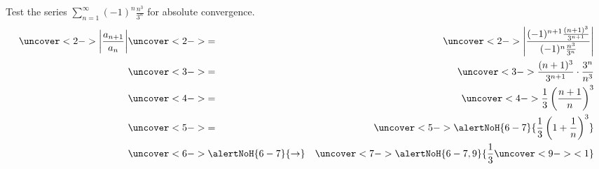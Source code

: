 \begin{frame}
\begin{example} %
Test the series $\displaystyle \sum_{n=1}^\infty (-1)^n \frac{n^3}{3^n}$ for absolute convergence.
\abovedisplayskip=0pt
\belowdisplayskip=0pt
\begin{eqnarray*}
\uncover<2->{%
\left| \frac{a_{n+1}}{a_n}\right| %
}%
 & \uncover<2->{=} & %
\uncover<2->{%
\left| \frac{(-1)^{n+1}\frac{(n+1)^3}{3^{n+1}}}{(-1)^n\frac{n^3}{3^n}}\right| %
}\\%
 & \uncover<3->{=} & %
\uncover<3->{%
\frac{(n+1)^3}{3^{n+1}}\cdot \frac{3^n}{n^3}%
}\\%
 & \uncover<4->{=} & %
\uncover<4->{%
\frac{1}{3} \left( \frac{n+1}{n}\right)^3%
}\\%
 & \uncover<5->{=} & %
\uncover<5->{%
\alertNoH{ 6-7}{%
\frac{1}{3} \left( 1 + \frac{1}{n}\right)^3%
}%
}\\%
 & \uncover<6->{\alertNoH{ 6-7}{\to}} & %
\uncover<7->{%
\alertNoH{ 6-7,9}{%
\frac{1}{3} \uncover<9->{ < 1 }
}%
}%
\end{eqnarray*}
%
\end{example}
\end{frame}
